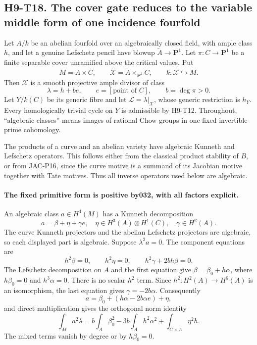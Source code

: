 
\subsection*{H9-T18. The cover gate reduces to the variable middle form of one incidence fourfold}

Let $A/k$ be an abelian fourfold over an algebraically closed field,
with ample class $h$, and let a genuine Lefschetz pencil have blowup
$\widetilde A\to\mathbf P^1$. Let $\pi:C\to\mathbf P^1$ be a finite
separable cover unramified above the critical values. Put
\[
 M=A\times C,\qquad
 \mathcal X=\widetilde A\times_{\mathbf P^1}C,
 \qquad k:\mathcal X\hookrightarrow M.
\]
Then $\mathcal X$ is a smooth projective ample divisor of class
\[
 \lambda=h+b e,\qquad e=[\text{point of }C],\qquad b=\deg\pi>0.
\]
Let $Y/k(C)$ be its generic fibre and let
$\mathcal L=\lambda|_{\mathcal X}$, whose generic restriction is
$h_Y$. Every homologically trivial cycle on $Y$ is admissible by
H9-T12. Throughout, ``algebraic classes'' means images of rational
Chow groups in one fixed invertible-prime cohomology.

The products of a curve and an abelian variety have algebraic
Kunneth and Lefschetz operators. This follows either from the
classical product stability of $B$, or from JAC-P16, since the
curve motive is a summand of its Jacobian motive together with
Tate motives. Thus all inverse operators used below are algebraic.

\paragraph{The fixed primitive form is positive by032, with all factors explicit.}
An algebraic class $a\in H^4(M)$ has a Kunneth decomposition
\[
                 a=\beta+\eta+\gamma e,
 \quad\eta\in H^3(A)\otimes H^1(C),\quad\gamma\in H^2(A).
\]
The curve Kunneth projectors and the abelian Lefschetz projectors
are algebraic, so each displayed part is algebraic. Suppose
$\lambda^2a=0$. The component equations are
\[
 h^2\beta=0,\qquad h^2\eta=0,
       \qquad h^2\gamma+2b h\beta=0.
\]
The Lefschetz decomposition on $A$ and the first equation give
$\beta=\beta_0+h\alpha$, where $h\beta_0=0$ and $h^3\alpha=0$.
There is no scalar $h^2$ term. Since
$h^2:H^2(A)\to H^6(A)$ is an isomorphism, the last equation gives
$\gamma=-2b\alpha$. Consequently
\[
 a=\beta_0+(h\alpha-2b\alpha e)+\eta,
\]
and direct multiplication gives the orthogonal norm identity
\[
 \int_M a^2\lambda
   =b\int_A\beta_0^2
       -3b\int_Ah^2\alpha^2
       +\int_{C\times A}\eta^2h.                          \tag{H9.86}
\]
The mixed terms vanish by degree or by $h\beta_0=0$.

